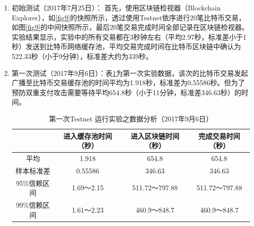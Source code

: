 		\begin{enumerate}
			\item 初始测试（2017年7月25日）：
			首先，使用区块链检视器（Blockchain Explorer）\supercite{Blockchainexplorer:Ananalyticalprocessandinvestigationenvironmentforbitcoin}，如\ref{fig9}的快照所示，透过使用Testnet依序进行20笔比特币交易，如图\ref{fig9}的中间快照所示，最后20笔交易完成时间全部记录在区块链检视器。实验结果显示，实验中的所有交易都在3秒钟左右（平均2.97秒，标准差小于1秒）发送到比特币网络缓存池，平均交易完成时间在比特币区块链中确认为522.33秒（小于9分钟），标准差大约为339秒。

			\item 第一次测试（2017年9月6日）：表\ref{1general}为第一次实验数据，该次的比特币交易发起广播至比特币交易缓存池的时间平均为1.918秒，标准差为0.55586秒。但为了预防双重支付攻击需要等待平均654.8秒（小于11分钟，标准差346.63秒）的时间。

				\begin{table}[!htbp]
				\centering
				\caption{第一次Testnet 运行实验之数据分析（2017年9月6日）}
				\label{1general}
				\begin{tabular}{|c|c|c|c|}
				\hline
				         & 进入缓存池时间（秒） & 进入区块链时间（秒）    & 完成交易时间（秒）     \\ \hline
				平均       & 1.918      & 654.8         & 654.8         \\ \hline
				样本标准差    & 0.55586    & 346.63        & 346.63        \\ \hline
				95\%信赖区间 & 1.69～2.15  & 511.72～797.88 & 511.72～797.88 \\ \hline
				99\%信赖区间 & 1.61～2.23  & 460.9～848.7   & 460.9～848.7   \\ \hline
				\end{tabular}
				\end{table}


\end{enumerate}

